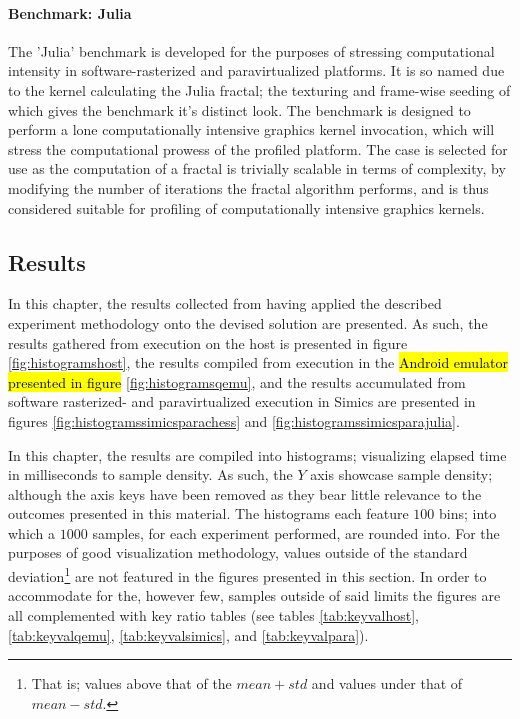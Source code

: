 \paragraph{Benchmark: Julia}
\label{par:experimentalmethodology_benchmarking_benchmarkjulia}
The 'Julia' benchmark is developed for the purposes of stressing computational intensity in software-rasterized and paravirtualized platforms.
It is so named due to the kernel calculating the Julia fractal; the texturing and frame-wise seeding of which gives the benchmark it's distinct look.
The benchmark is designed to perform a lone computationally intensive graphics kernel invocation, which will stress the computational prowess of the profiled platform.
The case is selected for use as the computation of a fractal is trivially scalable in terms of complexity, by modifying the number of iterations the fractal algorithm performs, and is thus considered suitable for profiling of computationally intensive graphics kernels.

\subsection{Results}
\label{sec:results}
In this chapter, the results collected from having applied the described experiment methodology onto the devised solution are presented.
As such, the results gathered from execution on the host is presented in figure \ref{fig:histogramshost}, the results compiled from execution in the \hl{Android emulator presented in figure} \ref{fig:histogramsqemu}, and the results accumulated from software rasterized- and paravirtualized execution in Simics are presented in figures \ref{fig:histogramssimicsparachess} and \ref{fig:histogramssimicsparajulia}.

In this chapter, the results are compiled into histograms; visualizing elapsed time in milliseconds to sample density.
As such, the $Y$ axis showcase sample density; although the axis keys have been removed as they bear little relevance to the outcomes presented in this material.
The histograms each feature $100$ bins; into which a $1000$ samples, for each experiment performed, are rounded into.
For the purposes of good visualization methodology, values outside of the standard deviation\footnote{That is; values above that of the $mean + std$ and values under that of $mean - std$.} are not featured in the figures presented in this section.
In order to accommodate for the, however few, samples outside of said limits the figures are all complemented with key ratio tables (see tables \ref{tab:keyvalhost}, \ref{tab:keyvalqemu}, \ref{tab:keyvalsimics}, and \ref{tab:keyvalpara}).

